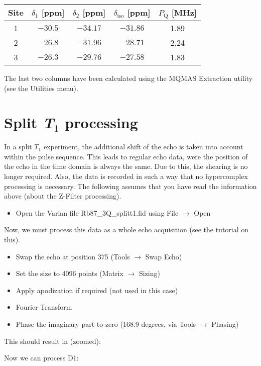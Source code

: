 \documentclass[11pt,a4paper]{article}
\begin{document}
\begin{center}
  \begin{tabular}{c|cc| c c}
	 \toprule
	 Site & $\delta_1$ [ppm]& $\delta_2$ [ppm]& $\delta_\text{iso}$ [ppm]& $P_\text{Q}$ [MHz]  \\
	 \midrule
	 1 & $-30.5$ & $-34.17$ & $-31.86$ & 1.89 \\
	 2& $-26.8$ &$-31.96$  &$-28.71$ & 2.24\\
	 3& $-26.3$ &$-29.76$ & $-27.58$ & 1.83 \\
	\bottomrule
  \end{tabular}
\end{center}
The last two columns have been calculated using the MQMAS Extraction utility (see the Utilities menu). 


\section{Split \textit{T}$_\text{1}$ processing}
In a split $T_\text{1}$ experiment, the additional shift of the echo is taken into account within the pulse sequence.
This leads to regular echo data, were the position of the echo in the time domain is always the same.
Due to this, the shearing is no longer required.
Also, the data is recorded in such a way that no hypercomplex processing is necessary.
The following assumes that you have read the information above (about the Z-Filter processing).

\begin{itemize}
	\item Open the Varian file Rb87\_3Q\_splitt1.fid using File $\longrightarrow$ Open
\end{itemize}
Now, we must process this data as a whole echo acquisition (see the tutorial on this).

\begin{itemize}
	\item Swap the echo at position 375 (Tools $\longrightarrow$ Swap Echo)
	\item Set the size to 4096 points (Matrix $\longrightarrow$ Sizing)
	\item Apply apodization if required (not used in this case)
	\item Fourier Transform
	\item Phase the imaginary part to zero (168.9 degrees, via Tools $\longrightarrow$ Phasing)
\end{itemize}
This should result in (zoomed):
\begin{center}
\end{center}
Now we can process D1:
\end{document}
